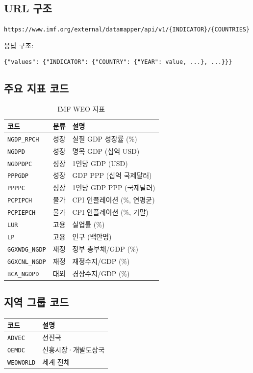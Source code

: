\documentclass[11pt,a4paper]{article}
\newcommand{\apibox}[1]{%
    \noindent\colorbox{lightaccent}{\parbox{\dimexpr\textwidth-2\fboxsep}{%
        \small\texttt{#1}%
    }}%
    \vspace{0.5em}%
}
\newcommand{\code}[1]{\texttt{#1}}
\begin{document}
\subsection{URL 구조}

\apibox{https://www.imf.org/external/datamapper/api/v1/\{INDICATOR\}/\{COUNTRIES\}}

응답 구조:
\begin{lstlisting}
{"values": {"INDICATOR": {"COUNTRY": {"YEAR": value, ...}, ...}}}
\end{lstlisting}

\subsection{주요 지표 코드}

\begin{table}[h]
\centering
\caption{IMF WEO 지표}
\begin{tabularx}{\textwidth}{l l X}
\toprule
\textbf{코드} & \textbf{분류} & \textbf{설명} \\
\midrule
\code{NGDP\_RPCH}    & 성장 & 실질 GDP 성장률 (\%) \\
\code{NGDPD}         & 성장 & 명목 GDP (십억 USD) \\
\code{NGDPDPC}       & 성장 & 1인당 GDP (USD) \\
\code{PPPGDP}        & 성장 & GDP PPP (십억 국제달러) \\
\code{PPPPC}         & 성장 & 1인당 GDP PPP (국제달러) \\
\code{PCPIPCH}       & 물가 & CPI 인플레이션 (\%, 연평균) \\
\code{PCPIEPCH}      & 물가 & CPI 인플레이션 (\%, 기말) \\
\code{LUR}           & 고용 & 실업률 (\%) \\
\code{LP}            & 고용 & 인구 (백만명) \\
\code{GGXWDG\_NGDP}  & 재정 & 정부 총부채/GDP (\%) \\
\code{GGXCNL\_NGDP}  & 재정 & 재정수지/GDP (\%) \\
\code{BCA\_NGDPD}    & 대외 & 경상수지/GDP (\%) \\
\bottomrule
\end{tabularx}
\end{table}

\subsection{지역 그룹 코드}

\begin{table}[h]
\centering
\begin{tabular}{l l}
\toprule
\textbf{코드} & \textbf{설명} \\
\midrule
\code{ADVEC}    & 선진국 \\
\code{OEMDC}    & 신흥시장·개발도상국 \\
\code{WEOWORLD} & 세계 전체 \\
\bottomrule
\end{tabular}
\end{table}
\end{document}
